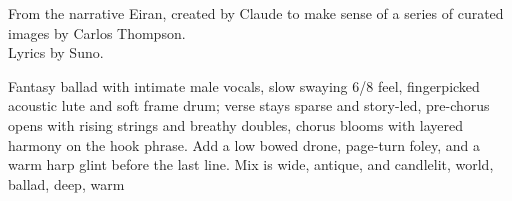 
\begin{notes}
From the narrative Eiran, created by Claude to make sense of a series of curated images by Carlos Thompson.\\
Lyrics by Suno.
\end{notes}
\begin{style}
Fantasy ballad with intimate male vocals, slow swaying 6/8 feel, fingerpicked acoustic lute and soft frame drum; verse stays sparse and story-led, pre-chorus opens with rising strings and breathy doubles, chorus blooms with layered harmony on the hook phrase. %
Add a low bowed drone, page-turn foley, and a warm harp glint before the last line. %
Mix is wide, antique, and candlelit, world, ballad, deep, warm
\end{style}
